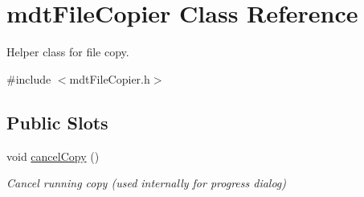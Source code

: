 \hypertarget{classmdt_file_copier}{
\section{mdtFileCopier Class Reference}
\label{classmdt_file_copier}
}


Helper class for file copy.  




{\ttfamily \#include $<$mdtFileCopier.h$>$}

\subsection*{Public Slots}
\begin{DoxyCompactItemize}
\item 
\hypertarget{classmdt_file_copier_ab9a0a4121a3fa0c70652413ad7917714}{
void \hyperlink{classmdt_file_copier_ab9a0a4121a3fa0c70652413ad7917714}{cancelCopy} ()}
\label{classmdt_file_copier_ab9a0a4121a3fa0c70652413ad7917714}

\begin{DoxyCompactList}\small\item\em Cancel running copy (used internally for progress dialog) \end{DoxyCompactList}\end{DoxyCompactItemize}
